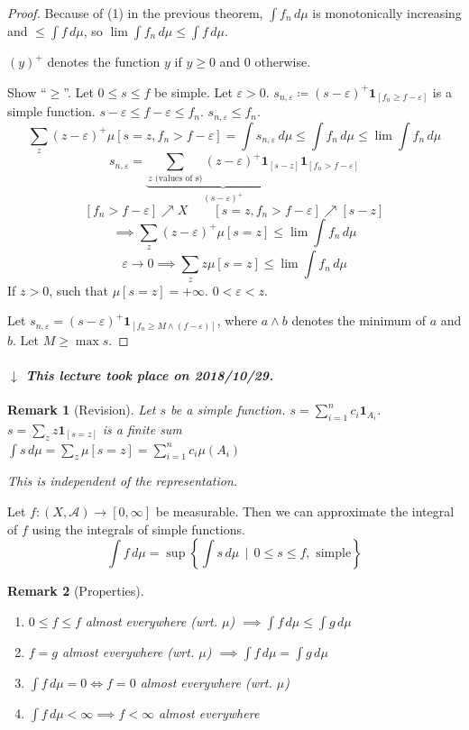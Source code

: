 \documentclass[a4paper]{article}
\numberwithin{lecref}{section}
\theoremstyle{break}
\newtheorem*{Remark}{Remark}
\newcommand{\dateref}[1]{%
  \begin{mdframed}[backgroundcolor=gray!10,innerbottommargin=0pt,innertopmargin=0pt]
    \paragraph{\textit{$\downarrow$ This lecture took place on #1.}}%
  \end{mdframed}%
}
\newcommand{\SetDef}[2]{\left\{#1\,\mid\,#2\right\}}
\begin{document}
\begin{proof}
  Because of (1) in the previous theorem, $\int f_n \, d\mu$ is monotonically increasing and $\leq \int f \, d\mu$, so $\lim \int f_n \, d\mu \leq \int f \, d\mu$.

  $(y)^+$ denotes the function $y$ if $y \geq 0$ and $0$ otherwise.

  Show \enquote{$\geq$}. Let $0 \leq s \leq f$ be simple. Let $\varepsilon > 0$.
  $s_{n,\varepsilon} \coloneqq (s - \varepsilon)^+ \mathbf{1}_{[f_n \geq f - \varepsilon]}$ is a simple function. $s - \varepsilon \leq f - \varepsilon \leq f_n$. $s_{n,\varepsilon} \leq f_n$.
  \[ \sum_{z} (z - \varepsilon)^+ \mu\left[s = z, f_n > f - \varepsilon\right] = \int s_{n,\varepsilon} \, d\mu \leq \int f_n \, d\mu \leq \lim \int f_n \, d\mu \]
  \[ s_{n,\varepsilon} = \underbrace{\sum_{z \text{ (values of s)}} (z - \varepsilon)^+ \mathbf{1}_{\left[s - z\right]}}_{(s - \varepsilon)^+} \mathbf{1}_{[f_n > f - \varepsilon]} \]
  \[ [f_n > f - \varepsilon] \nearrow X \qquad [s = z, f_n > f - \varepsilon] \nearrow [s - z] \]
  \[ \implies \sum_z (z - \varepsilon)^+ \mu[s = z] \leq \lim \int f_n \, d\mu \]
  \[ \varepsilon\to0 \implies \sum_z z \mu[s = z] \leq \lim \int f_n \, d\mu \]
  If $z > 0$, such that $\mu[s = z] = +\infty$. $0 < \varepsilon < z$.

  Let $s_{n,\varepsilon} = (s - \varepsilon)^+ \mathbf{1}_{[f_n \geq M \land (f - \varepsilon)]}$, where $a \land b$ denotes the minimum of $a$ and $b$. Let $M \geq \max{s}$.
\end{proof}


\dateref{2018/10/29}

\begin{Remark}[Revision]
  Let $s$ be a simple function. $s = \sum_{i = 1}^n c_i \mathbf{1}_{A_i}$. \\
  $s = \sum_{z} z \mathbf{1}_{[s = z]}$ is a finite sum \\
  $\int s \, d\mu = \sum_z \mu[s = z] = \sum_{i=1}^n c_i \mu(A_i)$

  This is independent of the representation.
\end{Remark}

Let $f: (X, \mathcal A) \to [0, \infty]$ be measurable. Then we can approximate the integral of $f$ using the integrals of simple functions.
\[ \int f \, d\mu = \sup\SetDef{\int s \, d\mu}{0 \leq s \leq f, \text{ simple}} \]

\begin{Remark}[Properties]
  \begin{enumerate}
    \item $0 \leq f \leq f$ almost everywhere (wrt. $\mu$) $\implies \int f \, d\mu \leq \int g \, d\mu$
    \item $f = g$ almost everywhere (wrt. $\mu$) $\implies \int f \, d\mu = \int g \, d\mu$
    \item $\int f \, d\mu = 0 \iff f = 0$ almost everywhere (wrt. $\mu$)
    \item $\int f \, d\mu < \infty \implies f < \infty$ almost everywhere
  \end{enumerate}
\end{Remark}
\end{document}
